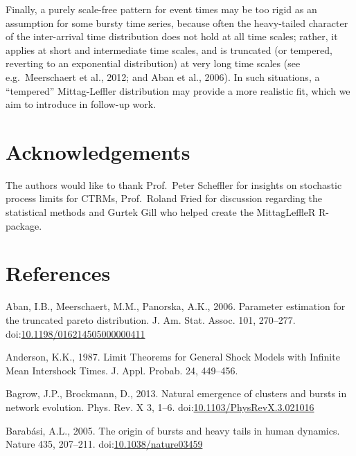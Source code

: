 \documentclass[]{elsarticle} %
\begin{document}
Finally, a purely scale-free pattern for event times may be too rigid as
an assumption for some bursty time series, because often the
heavy-tailed character of the inter-arrival time distribution does not
hold at all time scales; rather, it applies at short and intermediate
time scales, and is truncated (or tempered, reverting to an exponential
distribution) at very long time scales (see e.g.~Meerschaert et al.,
2012; and Aban et al., 2006). In such situations, a ``tempered''
Mittag-Leffler distribution may provide a more realistic fit, which we
aim to introduce in follow-up work.

\hypertarget{acknowledgements}{%
\section*{Acknowledgements}\label{acknowledgements}}

The authors would like to thank Prof.~Peter Scheffler for insights on
stochastic process limits for CTRMs, Prof.~Roland Fried for discussion
regarding the statistical methods and Gurtek Gill who helped create the
MittagLeffleR R-package.

\newpage

\hypertarget{references}{%
\section*{References}\label{references}}

\hypertarget{refs}{}
\leavevmode\hypertarget{ref-Aban06}{}%
Aban, I.B., Meerschaert, M.M., Panorska, A.K., 2006. Parameter
estimation for the truncated pareto distribution. J. Am. Stat. Assoc.
101, 270--277.
doi:\href{https://doi.org/10.1198/016214505000000411}{10.1198/016214505000000411}

\leavevmode\hypertarget{ref-Anderson1987}{}%
Anderson, K.K., 1987. Limit Theorems for General Shock Models with
Infinite Mean Intershock Times. J. Appl. Probab. 24, 449--456.

\leavevmode\hypertarget{ref-Bagrow2013}{}%
Bagrow, J.P., Brockmann, D., 2013. Natural emergence of clusters and
bursts in network evolution. Phys. Rev. X 3, 1--6.
doi:\href{https://doi.org/10.1103/PhysRevX.3.021016}{10.1103/PhysRevX.3.021016}

\leavevmode\hypertarget{ref-Barabasi2005}{}%
Barabási, A.L., 2005. The origin of bursts and heavy tails in human
dynamics. Nature 435, 207--211.
doi:\href{https://doi.org/10.1038/nature03459}{10.1038/nature03459}
\end{document}
